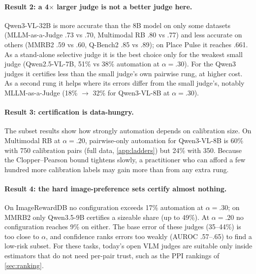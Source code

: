 \paragraph{Result 2: a 4$\times$ larger judge is not a better judge here.}
Qwen3-VL-32B is more accurate than the 8B model on only some datasets (MLLM-as-a-Judge .73 vs .70, Multimodal RB .80 vs .77) and less accurate on others (MMRB2 .59 vs .60, Q-Bench2 .85 vs .89); on Place Pulse it reaches .661.
As a stand-alone selective judge it is the best choice only for the weakest small judge (Qwen2.5-VL-7B, 51\% vs 38\% automation at $\alpha=.30$). For the Qwen3 judges it certifies less than the small judge's own pairwise rung, at higher cost.
As a second rung it helps where its errors differ from the small judge's, notably MLLM-as-a-Judge (18\% $\to$ 32\% for Qwen3-VL-8B at $\alpha=.30$).

\paragraph{Result 3: certification is data-hungry.}
The subset results show how strongly automation depends on calibration size. On Multimodal RB at $\alpha=.20$, pairwise-only automation for Qwen3-VL-8B is 60\% with 750 calibration pairs (full data, \cref{app:ladders}) but 24\% with 350. Because the Clopper--Pearson bound tightens slowly, a practitioner who can afford a few hundred more calibration labels may gain more than from any extra rung.

\paragraph{Result 4: the hard image-preference sets certify almost nothing.}
On ImageRewardDB no configuration exceeds 17\% automation at $\alpha=.30$; on MMRB2 only Qwen3.5-9B certifies a sizeable share (up to 49\%). At $\alpha=.20$ no configuration reaches 9\% on either. The base error of these judges (35--44\%) is too close to $\alpha$, and confidence ranks errors too weakly (AUROC .57--.65) to find a low-risk subset.
For these tasks, today's open VLM judges are suitable only inside estimators that do not need per-pair trust, such as the PPI rankings of \cref{sec:ranking}.
